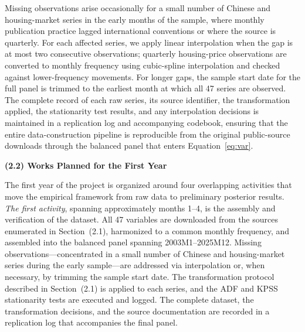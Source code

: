 \indent Missing observations arise occasionally for a small number of Chinese and housing-market series in the early months of the sample, where monthly publication practice lagged international conventions or where the source is quarterly. For each affected series, we apply linear interpolation when the gap is at most two consecutive observations; quarterly housing-price observations are converted to monthly frequency using cubic-spline interpolation and checked against lower-frequency movements. For longer gaps, the sample start date for the full panel is trimmed to the earliest month at which all 47 series are observed. The complete record of each raw series, its source identifier, the transformation applied, the stationarity test results, and any interpolation decisions is maintained in a replication log and accompanying codebook, ensuring that the entire data-construction pipeline is reproducible from the original public-source downloads through the balanced panel that enters Equation~\eqref{eq:var}.

\bigskip

\noindent\textbf{(2.2) Works Planned for the First Year}

\medskip

The first year of the project is organized around four overlapping activities that move the empirical framework from raw data to preliminary posterior results. \textit{The first activity}, spanning approximately months 1--4, is the assembly and verification of the dataset. All 47 variables are downloaded from the sources enumerated in Section~(2.1), harmonized to a common monthly frequency, and assembled into the balanced panel spanning 2003M1--2025M12. Missing observations---concentrated in a small number of Chinese and housing-market series during the early sample---are addressed via interpolation or, when necessary, by trimming the sample start date. The transformation protocol described in Section~(2.1) is applied to each series, and the ADF and KPSS stationarity tests are executed and logged. The complete dataset, the transformation decisions, and the source documentation are recorded in a replication log that accompanies the final panel.


